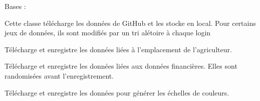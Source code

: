 \documentclass[letterpaper,10pt,french]{sphinxmanual}
\begin{document}
\begin{fulllineitems}
\label{\detokenize{agri_data:agri_data.data_draw.RandomDraw}}
\sphinxAtStartPar
Bases : 

\sphinxAtStartPar
Cette classe télécharge les données de GitHub et les stocke en local. Pour certains jeux de données, ils sont modifiés par un tri
alétoire à chaque login

\begin{fulllineitems}
\label{\detokenize{agri_data:agri_data.data_draw.RandomDraw.data_agri}}
\sphinxAtStartPar
Télécharge et enregistre les données liées à l’emplacement de l’agriculteur.

\end{fulllineitems}


\begin{fulllineitems}
\label{\detokenize{agri_data:agri_data.data_draw.RandomDraw.financial_data}}
\sphinxAtStartPar
Télécharge et enregistre les données liées aux données financières.
Elles sont randomisées avant l’enregistrement.

\end{fulllineitems}


\begin{fulllineitems}
\label{\detokenize{agri_data:agri_data.data_draw.RandomDraw.gauges_val}}
\sphinxAtStartPar
Télécharge et enregistre les données pour générer les échelles de couleurs.

\end{fulllineitems}



\end{fulllineitems}
\end{document}
